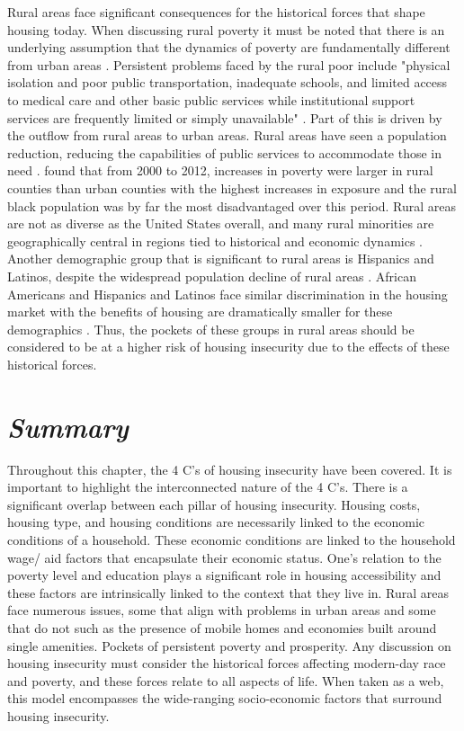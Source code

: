  Rural areas face significant consequences for the historical forces that shape housing today. When discussing rural poverty it must be noted that there is an underlying assumption that the dynamics of poverty are fundamentally different from urban areas \citep{thiede_spatial_2018}. Persistent problems faced by the rural poor include "physical isolation and poor public transportation, inadequate schools, and limited access to medical care and other basic public services while institutional support services are frequently limited or simply unavailable" \citep[?]{lichter_changing_2007}. Part of this is driven by the outflow from rural areas to urban areas. Rural areas have seen a population reduction, reducing the capabilities of public services to accommodate those in need \citep{bjerke_mover_2019}.  \citet{thiede_spatial_2018} found that from 2000 to 2012, increases in poverty were larger in rural counties than urban counties with the highest increases in exposure and the rural black population was by far the most disadvantaged over this period. Rural areas are not as diverse as the United States overall, and many rural minorities are geographically central in regions tied to historical and economic dynamics \citep{hac_race_2012}. Another demographic group that is significant to rural areas is Hispanics and Latinos, despite the widespread population decline of rural areas \citep{lichter_demographic_2020}. African Americans and Hispanics and Latinos face similar discrimination in the housing market with the benefits of housing are dramatically smaller for these demographics \citep{krivo_housing_2004}. Thus, the pockets of these groups in rural areas should be considered to be at a higher risk of housing insecurity due to the effects of these historical forces. 

 
 
\section{\textit{Summary}}

Throughout this chapter, the 4 C's of housing insecurity have been covered. It is important to highlight the interconnected nature of the 4 C's. There is a significant overlap between each pillar of housing insecurity. Housing costs, housing type, and housing conditions are necessarily linked to the economic conditions of a household. These economic conditions are linked to the household wage/ aid factors that encapsulate their economic status. One's relation to the poverty level and education plays a significant role in housing accessibility and these factors are intrinsically linked to the context that they live in. Rural areas face numerous issues, some that align with problems in urban areas and some that do not such as the presence of mobile homes and economies built around single amenities. Pockets of persistent poverty and prosperity. Any discussion on housing insecurity must consider the historical forces affecting modern-day race and poverty, and these forces relate to all aspects of life. When taken as a web, this model encompasses the wide-ranging socio-economic factors that surround housing insecurity. 

\endinput